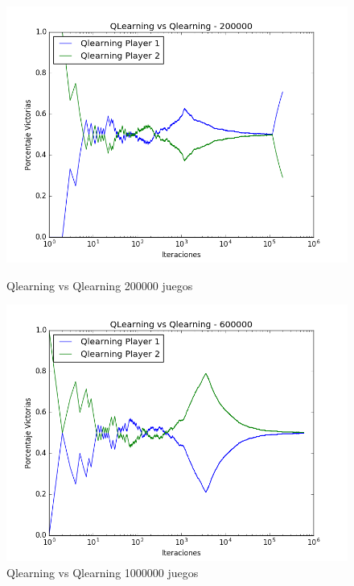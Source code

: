 \begin{figure}[h]
 \centering
 \begin{minipage}{.45\textwidth}
	\centering
	\includegraphics[scale=0.35]{img1/QlearningVsQlearning_200000_6x5_merge.png}
        \caption{Qlearning vs Qlearning 200000 juegos}
  \end{minipage}
 \begin{minipage}{.5\textwidth}
	\centering
	\includegraphics[scale=0.35]{img1/QlearningVsQlearning_600000_6x5_merge.png}
        \caption{Qlearning vs Qlearning 1000000 juegos}
  \end{minipage}
\end{figure}


